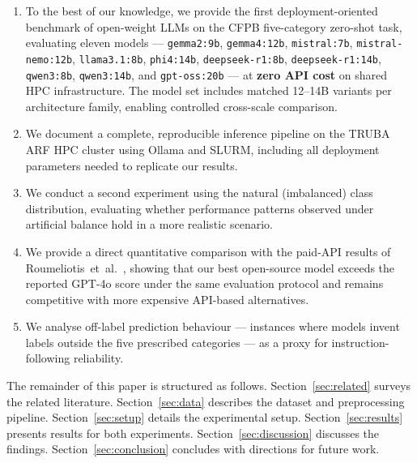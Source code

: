\documentclass[a4paper,fleqn]{cas-dc}
\begin{document}
\begin{enumerate}
  \item To the best of our knowledge, we provide the first
        deployment-oriented benchmark of open-weight LLMs on the
        CFPB five-category zero-shot task, evaluating eleven models ---
        \texttt{gemma2:9b}, \texttt{gemma4:12b}, \texttt{mistral:7b},
        \texttt{mistral-nemo:12b}, \texttt{llama3.1:8b}, \texttt{phi4:14b},
        \texttt{deepseek-r1:8b}, \texttt{deepseek-r1:14b},
        \texttt{qwen3:8b}, \texttt{qwen3:14b}, and \texttt{gpt-oss:20b}
        --- at \textbf{zero API cost} on shared HPC infrastructure.
        The model set includes matched 12--14B variants per architecture
        family, enabling controlled cross-scale comparison.

  \item We document a complete, reproducible inference pipeline on the
        TRUBA ARF HPC cluster using Ollama and SLURM, including
        all deployment parameters needed to replicate our results.

  \item We conduct a second experiment using the natural (imbalanced)
        class distribution, evaluating whether performance patterns
        observed under artificial balance hold in a more realistic
        scenario.

  \item We provide a direct quantitative comparison with the paid-API
        results of Roumeliotis~et~al.\ \cite{roumeliotis2025think},
        showing that our best open-source model exceeds the reported
        GPT-4o score under the same evaluation protocol and remains
        competitive with more expensive API-based alternatives.

  \item We analyse off-label prediction behaviour --- instances where
        models invent labels outside the five prescribed categories ---
        as a proxy for instruction-following reliability.
\end{enumerate}

The remainder of this paper is structured as follows.
Section~\ref{sec:related} surveys the related literature.
Section~\ref{sec:data} describes the dataset and preprocessing
pipeline. Section~\ref{sec:setup} details the experimental setup.
Section~\ref{sec:results} presents results for both experiments.
Section~\ref{sec:discussion} discusses the findings.
Section~\ref{sec:conclusion} concludes with directions for future work.
\end{document}
